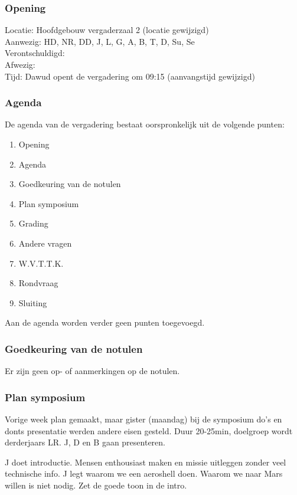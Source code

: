 \subsubsection{Opening}
Locatie: Hoofdgebouw vergaderzaal 2 (locatie gewijzigd)\\
Aanwezig: HD, NR, DD, J, L, G, A, B, T, D, Su, Se\\
Verontschuldigd: \\
Afwezig: \\
Tijd: Dawud opent de vergadering om 09:15 (aanvangstijd gewijzigd)\\

\subsubsection{Agenda}
De agenda van de vergadering bestaat oorspronkelijk uit de volgende punten:
\begin{enumerate}
\item Opening
\item Agenda
\item Goedkeuring van de notulen
\item Plan symposium
\item Grading
\item Andere vragen
\item W.V.T.T.K.
\item Rondvraag
\item Sluiting
\end{enumerate}

Aan de agenda worden verder geen punten toegevoegd.

\subsubsection{Goedkeuring van de notulen}
Er zijn geen op- of aanmerkingen op de notulen.

\subsubsection{Plan symposium}
Vorige week plan gemaakt, maar gister (maandag) bij de symposium do's en donts presentatie werden andere eisen gesteld. Duur 20-25min, doelgroep wordt derderjaars LR. J, D en B gaan presenteren.

J doet introductie. Mensen enthousiast maken en missie uitleggen zonder veel technische info. J legt waarom we een aeroshell doen. Waarom we naar Mars willen is niet nodig. Zet de goede toon in de intro. 

